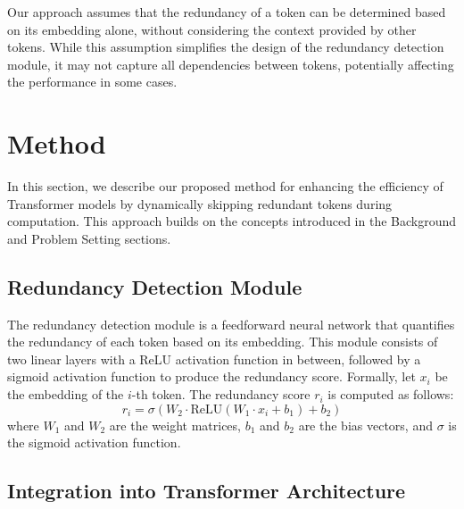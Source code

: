 \documentclass{article} %
\begin{document}
Our approach assumes that the redundancy of a token can be determined based on its embedding alone, without considering the context provided by other tokens. While this assumption simplifies the design of the redundancy detection module, it may not capture all dependencies between tokens, potentially affecting the performance in some cases.

\section{Method}
\label{sec:method}

In this section, we describe our proposed method for enhancing the efficiency of Transformer models by dynamically skipping redundant tokens during computation. This approach builds on the concepts introduced in the Background and Problem Setting sections.

\subsection{Redundancy Detection Module}

The redundancy detection module is a feedforward neural network that quantifies the redundancy of each token based on its embedding. This module consists of two linear layers with a ReLU activation function in between, followed by a sigmoid activation function to produce the redundancy score. Formally, let \( x_i \) be the embedding of the \( i \)-th token. The redundancy score \( r_i \) is computed as follows:
\begin{equation}
    r_i = \sigma(W_2 \cdot \text{ReLU}(W_1 \cdot x_i + b_1) + b_2)
\end{equation}
where \( W_1 \) and \( W_2 \) are the weight matrices, \( b_1 \) and \( b_2 \) are the bias vectors, and \( \sigma \) is the sigmoid activation function.

\subsection{Integration into Transformer Architecture}
\end{document}
